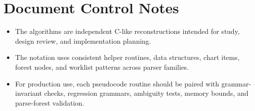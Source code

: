 \documentclass[10pt,letterpaper]{article}
\begin{document}
\clearpage
\section*{Document Control Notes}
{}
\begin{itemize}
\item The algorithms are independent C-like reconstructions intended for study, design review, and implementation planning.
\item The notation uses consistent helper routines, data structures, chart items, forest nodes, and worklist patterns across parser families.
\item For production use, each pseudocode routine should be paired with grammar-invariant checks, regression grammars, ambiguity tests, memory bounds, and parse-forest validation.
\end{itemize}
\end{document}
